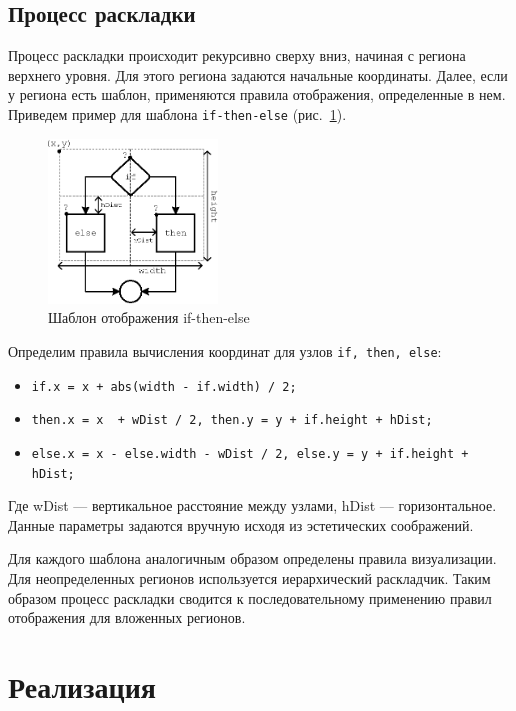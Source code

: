 \documentclass{jctart15a}
\begin{document}
\subsection{Процесс раскладки}

Процесс раскладки происходит рекурсивно сверху вниз, начиная с региона верхнего уровня. Для этого региона задаются начальные координаты. Далее, если у региона есть шаблон, применяются правила отображения, определенные в нем. Приведем пример для шаблона \verb|if-then-else| (рис.~\ref{fig:IfThenElse}).

\begin{figure}[htbp]
	\centering
		\includegraphics[width=0.4\textwidth]{Pic/IfThenElse.eps}
	\caption{Шаблон отображения if-then-else}
	\label{fig:IfThenElse}
\end{figure}

Определим правила вычисления координат для узлов \verb|if, then, else|:
\begin{itemize}
	\item \verb|if.x = x + abs(width - if.width) / 2;|
	\item \verb|then.x = x  + wDist / 2, then.y = y + if.height + hDist;|
  \item \verb|else.x = x - else.width - wDist / 2, else.y = y + if.height + hDist;|
\end{itemize}

Где wDist --- вертикальное расстояние между узлами, hDist --- горизонтальное. Данные параметры задаются вручную исходя из эстетических соображений.

Для каждого шаблона аналогичным образом определены правила визуализации. Для неопределенных регионов используется иерархический раскладчик. Таким образом процесс раскладки сводится к последовательному применению правил отображения для вложенных регионов.

\section{Реализация}
\end{document}
